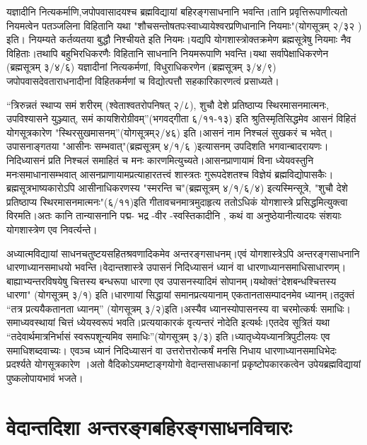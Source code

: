 यज्ञादीनि नित्यकर्माणि,जपोपवासादयश्च ब्रह्मविद्यायां बहिरङ्गसाधनानि भवन्ति।तानि प्रवृत्तिरूपाणीत्यतो नियमत्वेन पतञ्जलिना विहितानि यथा "शौचसन्तोषतपःस्वाध्यायेश्वरप्रणिधानानि नियमाः"(योगसूत्रम् २/३२ ) इति। नियम्यते कर्तव्यतया बुद्धौ निश्चीयते इति नियमः।यद्यपि योगशास्त्रोक्तक्रमेण ब्रह्मसूत्रेषु नियमाः नैव विहिताः।तथापि बहुभिरधिकरणैः विहितानि साधनानि नियमरूपाणि भवन्ति।यथा सर्वापेक्षाधिकरणेन (ब्रह्मसूत्रम् ३/४/६) यज्ञादीनां नित्यकर्मणां, विधुराधिकरणेन (ब्रह्मसूत्रम् ३/४/९) जपोपवासदेवताराधनादीनां विहितकर्मणां च विद्योत्पत्तौ सहकारिकारणत्वं प्रसाध्यते।

“त्रिरुन्नतं स्थाप्य समं शरीरम् (श्वेताश्वतरोपनिषत् २/८), शुचौ देशे प्रतिष्ठाप्य स्थिरमासनमात्मनः, उपविश्यासने युञ्ज्यात्, समं कायशिरोग्रीवम्”(भगवद्गीता ६/११-१३) इति श्रुतिस्मृतिसिद्धमेव आसनं विहितं योगसूत्रकारेण "स्थिरसुखमासनम्”(योगसूत्रम्२/४६) इति।आसनं नाम निश्चलं सुखकरं च भवेत्।उपासनाङ्गतया "आसीनः सम्भवात्"(ब्रह्मसूत्रम् ४/१/६ )इत्यासनम् उपदिशति भगवान्बादरायणः।निदिध्यासनं प्रति निश्चलं समाहितं च मनः कारणमित्युच्यते।आसनप्राणायामं विना ध्येयवस्तुनि मनःसमाधानासम्भवात् आसनप्राणायामप्रत्याहारतत्त्वं शास्त्रतः गुरूपदेशतश्च विज्ञेयं ब्रह्मविद्योपासकैः। ब्रह्मसूत्रभाष्यकारोऽपि आसीनाधिकरणस्य "स्मरन्ति च"(ब्रह्मसूत्रम् ४/१/६/४) इत्यस्मिन्सूत्रे, "शुचौ देशे प्रतिष्ठाप्य स्थिरमासनमात्मनः"(६/११)इति गीतावचनमात्रमुदाहृत्य ततोऽधिकं योगशास्त्रे प्रसिद्धमित्युक्त्वा विरमति।अतः कानि तान्यासनानि पद्म- भद्र -वीर -स्वस्तिकादीनि , कथं वा अनुष्ठेयानीत्यादयः संशयाः योगशास्त्रेण एव निवर्त्यन्ते।

अध्यात्मविद्यायां साधनचतुष्टयसहितश्रवणादिकमेव अन्तरङ्गसाधनम्।एवं योगशास्त्रेऽपि अन्तरङ्गसाधनानि धारणाध्यानसमाधयो भवन्ति।वेदान्तशास्त्रे उपासनं निदिध्यासनं ध्यानं वा धारणाध्यानसमाधिसाधारणम्। बाह्याभ्यन्तरविषयेषु चित्तस्य बन्धरूपा धारणा एव उपासनस्यादिमं सोपानम्।यथोक्तं"देशबन्धश्चित्तस्य धारणा" (योगसूत्रम् ३/१) इति।धारणायां सिद्धायां समानप्रत्ययानाम् एकतानतासम्पादनमेव ध्यानम्।तदुक्तं “तत्र प्रत्ययैकतानता ध्यानम्” (योगसूत्रम् ३/२)इति।अस्यैव ध्यानस्योपासनस्य वा चरमोत्कर्षः समाधिः।समाध्यवस्थायां चित्तं ध्येयस्वरूपं भवति।प्रत्ययाकारकं वृत्यन्तरं नोदेति इत्यर्थः।एतदेव सूत्रितं यथा “तदेवार्थमात्रनिर्भासं स्वरूपशून्यमिव समाधिः”(योगसूत्रम् ३/३) इति।ध्यातृध्येयध्यानत्रिपुटीलयः एव समाधिशब्दवाच्यः। एवञ्च ध्यानं निदिध्यासनं वा उत्तरोत्तरोत्कर्षं मनसि निधाय धारणाध्यानसमाधिभेदः प्रदर्श्यते योगसूत्रकारेण ।अतो वैदिकोऽयमष्टाङ्गयोगो वेदान्तसाधकानां प्रकृष्टोपकारकत्वेन उपेयब्रह्मविद्यायां पुष्कलोपायभावं भजते।

\section*{वेदान्तदिशा अन्तरङ्गबहिरङ्गसाधनविचारः}

